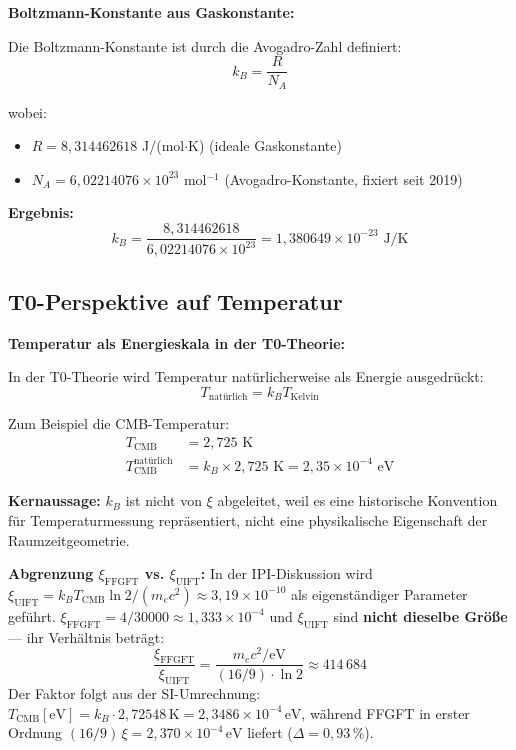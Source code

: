 	\begin{keyresult}
		\textbf{Boltzmann-Konstante aus Gaskonstante:}
		
		Die Boltzmann-Konstante ist durch die Avogadro-Zahl definiert:
		\begin{equation}
			k_B = \frac{R}{N_A}
		\end{equation}
		
		wobei:
		\begin{itemize}
			\item $R = 8{,}314462618$ J/(mol$\cdot$K) (ideale Gaskonstante)
			\item $N_A = 6{,}02214076 \times 10^{23}$ mol$^{-1}$ (Avogadro-Konstante, fixiert seit 2019)
		\end{itemize}
		
		\textbf{Ergebnis:}
		\begin{equation}
			k_B = \frac{8{,}314462618}{6{,}02214076 \times 10^{23}} = 1{,}380649 \times 10^{-23} \text{ J/K}
		\end{equation}
	\end{keyresult}
	
	\subsection{T0-Perspektive auf Temperatur}
	
	\begin{insight}
		\textbf{Temperatur als Energieskala in der T0-Theorie:}
		
		In der T0-Theorie wird Temperatur natürlicherweise als Energie ausgedrückt:
		\begin{equation}
			T_{\text{natürlich}} = k_B T_{\text{Kelvin}}
		\end{equation}
		
		Zum Beispiel die CMB-Temperatur:
		\begin{align}
			T_{\text{CMB}} &= 2{,}725 \text{ K} \\
			T_{\text{CMB}}^{\text{natürlich}} &= k_B \times 2{,}725 \text{ K} = 2{,}35 \times 10^{-4} \text{ eV}
		\end{align}
		
		\textbf{Kernaussage:} $k_B$ ist nicht von $\xi$ abgeleitet, weil es eine historische Konvention für Temperaturmessung repräsentiert, nicht eine physikalische Eigenschaft der Raumzeitgeometrie.

		\textbf{Abgrenzung $\xi_{\text{FFGFT}}$ vs. $\xi_{\text{UIFT}}$:}
		In der IPI-Diskussion wird $\xi_{\text{UIFT}} = k_B T_{\text{CMB}} \ln 2 / (m_e c^2) \approx 3{,}19 \times 10^{-10}$ als eigenständiger Parameter geführt.
		$\xi_{\text{FFGFT}} = 4/30000 \approx 1{,}333 \times 10^{-4}$ und $\xi_{\text{UIFT}}$ sind \textbf{nicht dieselbe Größe} — ihr Verhältnis beträgt:
		\begin{equation}
			\frac{\xi_{\text{FFGFT}}}{\xi_{\text{UIFT}}} = \frac{m_e c^2 / \text{eV}}{(16/9) \cdot \ln 2} \approx 414\,684
		\end{equation}
		Der Faktor folgt aus der SI-Umrechnung: $T_{\text{CMB}}[\text{eV}] = k_B \cdot 2{,}72548\,\text{K} = 2{,}3486 \times 10^{-4}\,\text{eV}$, während FFGFT in erster Ordnung $(16/9)\,\xi = 2{,}370 \times 10^{-4}\,\text{eV}$ liefert ($\Delta = 0{,}93\,\%$).
	\end{insight}
	
